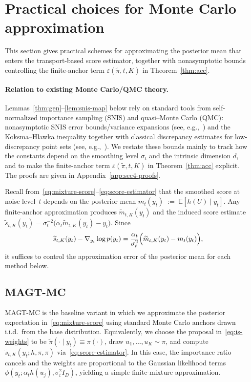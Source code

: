 \documentclass[12pt]{article}
\theoremstyle{definition} %
\providecommand{\method}{MAGT} %
\begin{document}
\section{Practical choices for Monte Carlo approximation}
\label{sec:mcapprox}
This section gives practical schemes for approximating the posterior mean that enters the transport-based
score estimator, together with nonasymptotic bounds controlling the finite-anchor term
$\varepsilon(\tilde{\pi},t,K)$ in Theorem~\ref{thm:acc}.

\paragraph{Relation to existing Monte Carlo/QMC theory.}
Lemmas~\ref{thm:gen}--\ref{lem:snis-map} below rely on standard tools from
self-normalized importance sampling (SNIS) and quasi--Monte Carlo (QMC):
nonasymptotic SNIS error bounds/variance expansions (see, e.g.,~\cite{owen2013mc}) and
the Koksma--Hlawka inequality together with classical discrepancy estimates for low-discrepancy point sets
(see, e.g.,~\cite{niederreiter1992random,dick2010digital}).
We restate these bounds mainly to track how the constants depend on the smoothing level $\sigma_t$ and the intrinsic dimension $d$,
and to make the finite-anchor term $\varepsilon(\tilde\pi,t,K)$ in Theorem~\ref{thm:acc} explicit.
The proofs are given in Appendix~\ref{app:sec4-proofs}.

Recall from~\eqref{eq:mixture-score}--\eqref{eq:score-estimator} that the smoothed score at noise level~$t$ depends on the posterior mean $m_t(y_t)\;:=\;\mathbb E[h(U)\mid y_t]$.
Any finite-anchor approximation produces $\widetilde m_{t,K}(y_t)$ and the induced score estimate
$\widetilde s_{t,K}(y_t)=\sigma_t^{-2}\bigl(\alpha_t \widetilde m_{t,K}(y_t)-y_t\bigr)$.
Since
\begin{equation}\label{eq:score-mean-error}
\widetilde s_{t,K}(y_t)-\nabla_{y_t}\log p(y_t)
=
\frac{\alpha_t}{\sigma_t^2}\Bigl(\widetilde m_{t,K}(y_t)-m_t(y_t)\Bigr),
\end{equation}
it suffices to control the approximation error of the posterior mean for each method below.

\subsection{\method{}-MC}
\method{}-MC is the baseline variant in which we approximate the posterior expectation in~\eqref{eq:mixture-score}
using standard Monte Carlo anchors drawn i.i.d.\ from the base distribution.
Equivalently, we choose the proposal in~\eqref{eq:is-weights} to be $\tilde\pi(\cdot\mid y_t)\equiv\pi(\cdot)$, draw $u_1,\dots,u_K\sim\pi$, and compute
$\widetilde s_{t,K}(y_t;h,\pi,\pi)$ via~\eqref{eq:score-estimator}.
In this case, the importance ratio cancels and the weights are proportional to the Gaussian likelihood terms
$\phi\!\left(y_t;\alpha_t h(u_j),\sigma_t^2 I_D\right)$, yielding a simple finite-mixture approximation.
\end{document}
